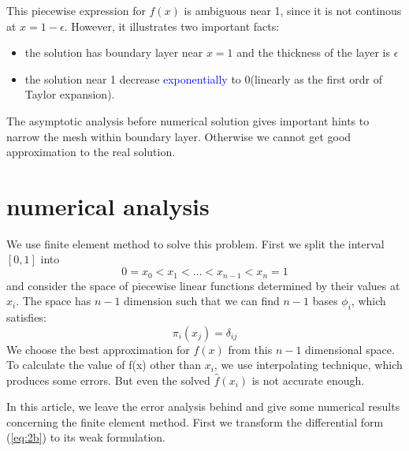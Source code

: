 \documentclass{article}
\begin{document}
This piecewise expression for $f(x)$ is ambiguous near 1, since it is not continous at $x=1-\epsilon$. However, it illustrates two important facts:
\begin{itemize}
\item{the solution has boundary layer near $x=1$ and the thickness of the layer is $\epsilon$}
\item {the solution near 1 decrease \textcolor{blue}{exponentially} to 0(linearly as the first ordr of Taylor expansion).}
\end{itemize}
The asymptotic analysis before numerical solution gives important hints to narrow the mesh within boundary layer. Otherwise we cannot get good approximation to the real solution.
\section{numerical analysis}
We use finite element method to solve this problem.
First we split the interval $[0,1]$ into 
\[
0=x_0 < x_1 < \dots < x_{n-1} < x_n=1 
\]
and consider the space of piecewise linear functions determined by their values at $x_i$. The space has $n-1$ dimension such that we can find $n-1$ bases $\phi_i$, which satisfies:
\[
\pi_i(x_j)=\delta_{ij}
\]
We choose the best approximation for $f(x)$ from this $n-1$ dimensional space. To calculate the value of f(x) other than $x_i$, we use interpolating technique, which produces some errors. But even the solved $\hat{f}(x_i)$ is not accurate enough.

In this article, we leave the error analysis behind and give some numerical results concerning the finite element method.
First we transform the differential form (\ref{eq:2b}) to its 
weak formulation. 
\end{document}
